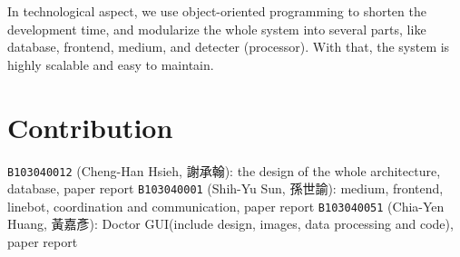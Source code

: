 \documentclass{article}
\begin{document}
In technological aspect, we use object-oriented programming to shorten the 
development time, and modularize the whole system into several parts, like 
database, frontend, medium, and detecter (processor). With that, the system 
is highly scalable and easy to maintain. 

\section{Contribution}
\label{sec:contribution}

\texttt{B103040012} (Cheng-Han Hsieh, 謝承翰): the design of the whole architecture, database, paper report
\texttt{B103040001} (Shih-Yu Sun, 孫世諭): medium, frontend, linebot, coordination and communication, paper report
\texttt{B103040051} (Chia-Yen Huang, 黃嘉彥): Doctor GUI(include design, images, data processing and code), paper report
\end{document}
